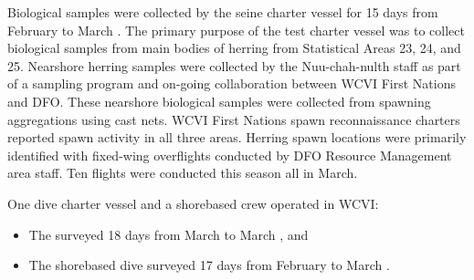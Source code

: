 Biological samples were collected by the seine charter vessel
 for 15 days from February  to March .
The primary purpose of the test charter vessel was to
collect biological samples from main bodies of herring
from Statistical Areas 23, 24, and 25.
Nearshore herring samples were collected by the Nuu-chah-nulth staff
as part of a sampling program and on-going collaboration
between WCVI First Nations and DFO.
These nearshore biological samples were collected from
spawning aggregations using cast nets.
WCVI First Nations spawn reconnaissance charters reported
spawn activity in all three areas.
Herring spawn locations were primarily identified with
fixed-wing overflights conducted by DFO Resource Management area staff.
Ten flights were conducted this season all in March.

One dive charter vessel and a shorebased crew operated in WCVI:

\begin{itemize}

\item The  surveyed 18 days
from March  to March , and

\item The shorebased dive surveyed 17 days
from February  to March .

\end{itemize}
